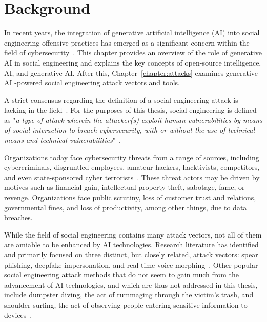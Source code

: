 \chapter{Background\label{chapter:background}}
\begin{comment}
\end{comment}


%
%
In recent years, the integration of generative artificial intelligence (AI) into social engineering offensive practices has emerged as a significant concern within the field of cybersecurity~\citep{blauth_AI_Crime_Overview_Malicious_Use_Abuse_2022, king_AI_Crime_Interdisciplinary_Analysis_2019, mirsky_Threat_Offensive_AI_Organizations_2023}. This chapter provides an overview of the role of generative AI in social engineering and explains the key concepts of open-source intelligence, AI, and generative AI. After this, Chapter~\ref{chapter:attacks} examines generative AI -powered social engineering attack vectors and tools.



%
%
A strict consensus regarding the definition of a social engineering attack is lacking in the field~\citep{hatfield_SE_Evolution_Concept_2018}. For the purposes of this thesis, social engineering is defined as "\textit{a type of attack wherein the attacker(s) exploit human vulnerabilities by means of social interaction to breach cybersecurity, with or without the use of technical means and technical vulnerabilities}"~\citep{wang_Defining_Social_Engineering_2020}.



%
%
Organizations today face cybersecurity threats from a range of sources, including cybercriminals, disgruntled employees, amateur hackers, hacktivists, competitors, and even state-sponsored cyber terrorists~\citep{mirsky_Threat_Offensive_AI_Organizations_2023}. These threat actors may be driven by motives such as financial gain, intellectual property theft, sabotage, fame, or revenge. Organizations face public scrutiny, loss of customer trust and relations, governmental fines, and loss of productivity, among other things, due to data breaches.


%
%
While the field of social engineering contains many attack vectors, not all of them are amiable to be enhanced by AI technologies. Research literature has identified and primarily focused on three distinct, but closely related, attack vectors: spear phishing, deepfake impersonation, and real-time voice morphing~\citep{king_AI_Crime_Interdisciplinary_Analysis_2019}. Other popular social engineering attack methods that do not seem to gain much from the advancement of AI technologies, and which are thus not addressed in this thesis, include dumpster diving, the act of rummaging through the victim’s trash, and shoulder surfing, the act of observing people entering sensitive information to devices~\citep{hatfield_SE_Evolution_Concept_2018}.

